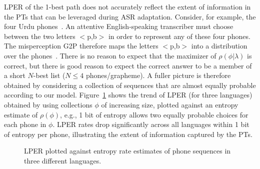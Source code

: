 

LPER of the 1-best path does not
accurately reflect the extent of information in the PTs that can be
leveraged during ASR adaptation.  Consider, for example, the four
Urdu phones~.  An attentive
English-speaking transcriber must choose between the two letters
$<$p,b$>$ in order to represent any of these four phones.  The
misperception G2P therefore maps the letters $<$p,b$>$ into a
distribution over the phones~.
There is no reason to expect that the maximizer of
$\rho(\phi|\lambda)$ is correct, but there is good reason to expect
the correct answer to be a member of a short $N$-best list ($N\le 4$
phones/grapheme).  A fuller picture is therefore obtained by
considering a collection of sequences that are almost equally 
probable according to our model. Figure~\ref{fig:listPER}
shows the trend of LPER (for three languages) obtained by
using collections $\phi$ of increasing size, plotted against an
entropy estimate of $\rho(\phi)$, e.g., 1 bit of entropy allows two equally
probable choices for each phone in $\phi$. LPER
rates drop significantly across all languages within 1
bit of entropy per phone, illustrating the extent of information
captured by the PTs.

\begin{figure}[t!]
  
  \vspace*{-0.5cm}
  \caption{LPER plotted against entropy rate estimates of phone sequences in three different languages.}
\label{fig:listPER}
\end{figure}

